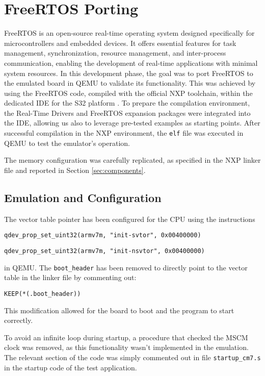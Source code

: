 \section{FreeRTOS Porting}
\label{sec:freertos}

FreeRTOS \cite{freertosGitHub} is an open-source real-time operating system designed specifically for microcontrollers and embedded devices. It offers essential features for task management, synchronization, resource management, and inter-process communication, enabling the development of real-time applications with minimal system resources.
In this development phase, the goal was to port FreeRTOS to the emulated board in QEMU to validate its functionality. This was achieved by using the FreeRTOS code, compiled with the official NXP toolchain, within the dedicated IDE for the S32 platform \cite{NXP_S32DS}. To prepare the compilation environment, the Real-Time Drivers and FreeRTOS expansion packages were integrated into the IDE, allowing us also to leverage pre-tested examples as starting points. After successful compilation in the NXP environment, the \texttt{elf} file was executed in QEMU to test the emulator’s operation.

The memory configuration was carefully replicated, as specified in the NXP linker file and reported in Section \ref{sec:components}.


\subsection{Emulation and Configuration}
The vector table pointer has been configured for the CPU using the instructions

\texttt{qdev\_prop\_set\_uint32(armv7m, "init-svtor", 0x00400000)}

\texttt{qdev\_prop\_set\_uint32(armv7m, "init-nsvtor", 0x00400000)}

\noindent in QEMU. The \texttt{boot\_header} has been removed to directly point to the vector table in the linker file by commenting out:

\texttt{KEEP(*(.boot\_header))}

\noindent This modification allowed for the board to boot and the program to start correctly.

To avoid an infinite loop during startup, a procedure that checked the MSCM clock was removed, as this functionality wasn’t implemented in the emulation. The relevant section of the code was simply commented out in file \texttt{startup\_cm7.s} in the startup code of the test application.


